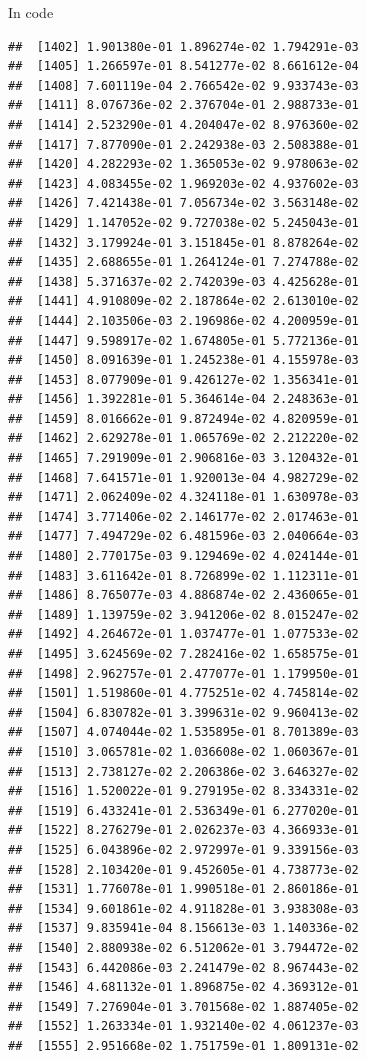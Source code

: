 \documentclass[ignorenonframetext,]{beamer}
\begin{document}
\begin{frame}[fragile]{In code}
\begin{verbatim}
##  [1402] 1.901380e-01 1.896274e-02 1.794291e-03
##  [1405] 1.266597e-01 8.541277e-02 8.661612e-04
##  [1408] 7.601119e-04 2.766542e-02 9.933743e-03
##  [1411] 8.076736e-02 2.376704e-01 2.988733e-01
##  [1414] 2.523290e-01 4.204047e-02 8.976360e-02
##  [1417] 7.877090e-01 2.242938e-03 2.508388e-01
##  [1420] 4.282293e-02 1.365053e-02 9.978063e-02
##  [1423] 4.083455e-02 1.969203e-02 4.937602e-03
##  [1426] 7.421438e-01 7.056734e-02 3.563148e-02
##  [1429] 1.147052e-02 9.727038e-02 5.245043e-01
##  [1432] 3.179924e-01 3.151845e-01 8.878264e-02
##  [1435] 2.688655e-01 1.264124e-01 7.274788e-02
##  [1438] 5.371637e-02 2.742039e-03 4.425628e-01
##  [1441] 4.910809e-02 2.187864e-02 2.613010e-02
##  [1444] 2.103506e-03 2.196986e-02 4.200959e-01
##  [1447] 9.598917e-02 1.674805e-01 5.772136e-01
##  [1450] 8.091639e-01 1.245238e-01 4.155978e-03
##  [1453] 8.077909e-01 9.426127e-02 1.356341e-01
##  [1456] 1.392281e-01 5.364614e-04 2.248363e-01
##  [1459] 8.016662e-01 9.872494e-02 4.820959e-01
##  [1462] 2.629278e-01 1.065769e-02 2.212220e-02
##  [1465] 7.291909e-01 2.906816e-03 3.120432e-01
##  [1468] 7.641571e-01 1.920013e-04 4.982729e-02
##  [1471] 2.062409e-02 4.324118e-01 1.630978e-03
##  [1474] 3.771406e-02 2.146177e-02 2.017463e-01
##  [1477] 7.494729e-02 6.481596e-03 2.040664e-03
##  [1480] 2.770175e-03 9.129469e-02 4.024144e-01
##  [1483] 3.611642e-01 8.726899e-02 1.112311e-01
##  [1486] 8.765077e-03 4.886874e-02 2.436065e-01
##  [1489] 1.139759e-02 3.941206e-02 8.015247e-02
##  [1492] 4.264672e-01 1.037477e-01 1.077533e-02
##  [1495] 3.624569e-02 7.282416e-02 1.658575e-01
##  [1498] 2.962757e-01 2.477077e-01 1.179950e-01
##  [1501] 1.519860e-01 4.775251e-02 4.745814e-02
##  [1504] 6.830782e-01 3.399631e-02 9.960413e-02
##  [1507] 4.074044e-02 1.535895e-01 8.701389e-03
##  [1510] 3.065781e-02 1.036608e-02 1.060367e-01
##  [1513] 2.738127e-02 2.206386e-02 3.646327e-02
##  [1516] 1.520022e-01 9.279195e-02 8.334331e-02
##  [1519] 6.433241e-01 2.536349e-01 6.277020e-01
##  [1522] 8.276279e-01 2.026237e-03 4.366933e-01
##  [1525] 6.043896e-02 2.972997e-01 9.339156e-03
##  [1528] 2.103420e-01 9.452605e-01 4.738773e-02
##  [1531] 1.776078e-01 1.990518e-01 2.860186e-01
##  [1534] 9.601861e-02 4.911828e-01 3.938308e-03
##  [1537] 9.835941e-04 8.156613e-03 1.140336e-02
##  [1540] 2.880938e-02 6.512062e-01 3.794472e-02
##  [1543] 6.442086e-03 2.241479e-02 8.967443e-02
##  [1546] 4.681132e-01 1.896875e-02 4.369312e-01
##  [1549] 7.276904e-01 3.701568e-02 1.887405e-02
##  [1552] 1.263334e-01 1.932140e-02 4.061237e-03
##  [1555] 2.951668e-02 1.751759e-01 1.809131e-02

\end{verbatim}
\end{frame}
\end{document}
